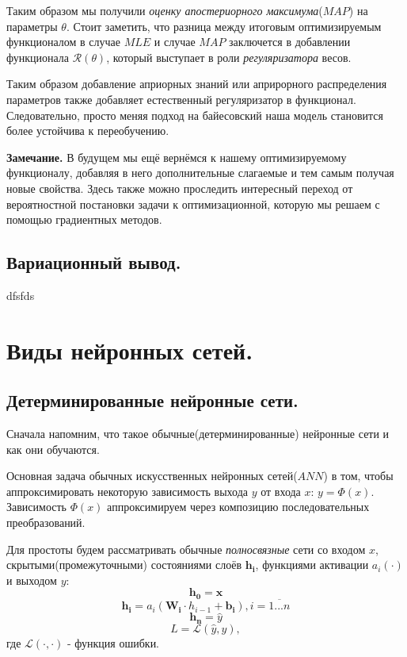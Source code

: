 Таким образом мы получили \textit{оценку апостериорного максимума}($MAP$) на параметры $\theta$. Стоит заметить, что разница между итоговым оптимизируемым функционалом в случае $MLE$ и случае $MAP$ заключется в добавлении функционала $\mathcal{R}(\theta)$,
 который выступает в роли \textit{регуляризатора} весов.

Таким образом добавление априорных знаний или априрорного распределения параметров также добавляет естественный регуляризатор в функционал. Следовательно, просто меняя подход на байесовский наша модель становится более устойчива к переобучению.

\textbf{Замечание.} В будущем мы ещё вернёмся к нашему оптимизируемому функционалу, добавляя в него дополнительные слагаемые и тем самым получая новые свойства.
 Здесь также можно проследить интересный переход от вероятностной постановки задачи к оптимизационной, которую мы решаем с помощью градиентных методов.

\section{Вариационный вывод.}

dfsfds

\chapter{Виды нейронных сетей.}

\section{Детерминированные нейронные сети.}

Сначала напомним, что такое обычные(детерминированные) нейронные сети и как они обучаются.

Основная задача обычных искусственных нейронных сетей($ANN$) в том, чтобы аппроксимировать некоторую зависимость выхода $y$ от
 входа $x$: $y = \Phi(x)$. Зависимость $\Phi(x)$ аппроксимируем через композицию последовательных преобразований.

Для простоты будем рассматривать обычные \textit{полносвязные} сети со входом $x$,
 скрытыми(промежуточными) состояниями слоёв $\bm{h_i}$, функциями активации $a_i(\cdot)$ и выходом $y$:
$$\bm{h_0} = \bm{x}$$
$$\bm{h_i} = a_i(\bm{W_i} \cdot h_{i-1} + \bm{b_i}), i = \overline{1...n}$$
$$\bm{h_n} = \widehat{y}$$
$$L = \mathcal{L}(\widehat{y}, y),$$ где $\mathcal{L}(\cdot, \cdot)$ - функция ошибки.

